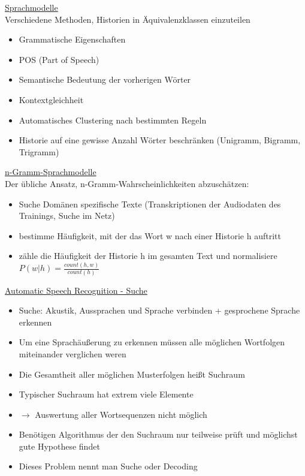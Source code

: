 \documentclass[a4paper,10pt,oneside]{article}
\begin{document}
\underline{Sprachmodelle} \\
Verschiedene Methoden, Historien in Äquivalenzklassen einzuteilen
	\begin{itemize}
		\item Grammatische Eigenschaften
		\item POS (Part of Speech)
		\item Semantische Bedeutung der vorherigen Wörter
		\item Kontextgleichheit 
		\item Automatisches Clustering nach bestimmten Regeln
		\item Historie auf eine gewisse Anzahl Wörter beschränken (Unigramm, Bigramm, Trigramm)
	\end{itemize}

\underline{n-Gramm-Sprachmodelle} \\
Der übliche Ansatz, n-Gramm-Wahrscheinlichkeiten abzuschätzen:
	\begin{itemize}
		\item Suche Domänen spezifische Texte (Transkriptionen der Audiodaten des Trainings, Suche im Netz)
		\item bestimme Häufigkeit, mit der das Wort w nach einer Historie h auftritt
		\item zähle die Häufigkeit der Historie h im gesamten Text und normalisiere $P(w|h) = \frac{count(h,w)}{count(h)}$
	\end{itemize}
	
\underline{Automatic Speech Recognition - Suche} \\
	\begin{itemize}
		\item Suche: Akustik, Aussprachen und Sprache verbinden + gesprochene Sprache erkennen
		\item Um eine Sprachäußerung zu erkennen müssen alle möglichen Wortfolgen miteinander verglichen weren
		\item Die Gesamtheit aller möglichen Musterfolgen heißt Suchraum
		\item Typischer Suchraum hat extrem viele Elemente
		\item[] $\rightarrow$ Auswertung aller Wortsequenzen nicht möglich
		\item Benötigen Algorithmus der den Suchraum nur teilweise prüft und möglichst gute Hypothese findet 
		\item Dieses Problem nennt man Suche oder Decoding 
	\end{itemize}
\end{document}
